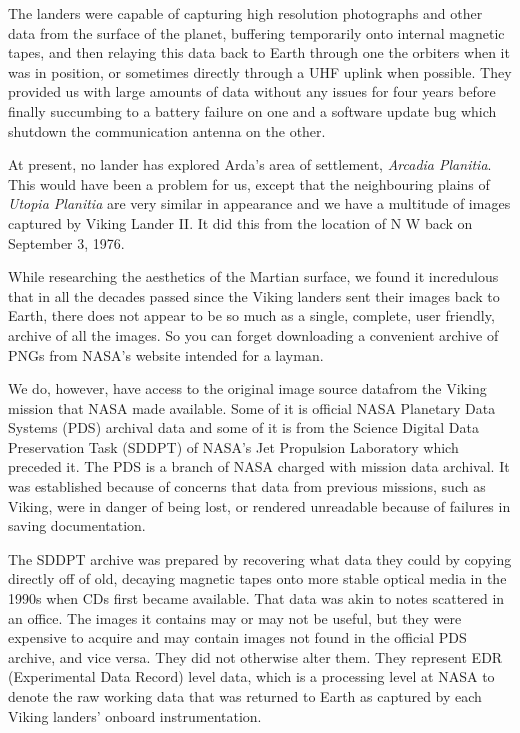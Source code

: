 The landers were capable of capturing high resolution photographs and other data from the surface of the planet, buffering temporarily onto internal magnetic tapes, and then relaying this data back to Earth through one the orbiters when it was in position, or sometimes directly through a UHF uplink when possible. They provided us with large amounts of data without any issues for four years before finally succumbing to a battery failure on one and a software update bug which shutdown the communication antenna on the other.

At present, no lander has explored Arda's area of settlement, {\it Arcadia Planitia}. This would have been a problem for us, except that the neighbouring plains of {\it Utopia Planitia} are very similar in appearance and we have a multitude of images captured by Viking Lander II. It did this from the location of N W back on September 3, 1976.

    {}


While researching the aesthetics of the Martian surface, we found it incredulous that in all the decades passed since the Viking landers sent their images back to Earth, there does not appear to be so much as a single, complete, user friendly, archive of all the images. So you can forget downloading a convenient archive of PNGs from NASA's website intended for a layman.\footnotecite[grayzeck2008]

We do, however, have access to the original image source data from the Viking mission that NASA made available. Some of it is official NASA Planetary Data Systems (PDS) archival data and some of it is from the Science Digital Data Preservation Task (SDDPT) of NASA's Jet Propulsion Laboratory which preceded it. The PDS is a branch of NASA charged with mission data archival. It was established because of concerns that data from previous missions, such as Viking, were in danger of being lost, or rendered unreadable because of failures in saving documentation.

The SDDPT archive was prepared by recovering what data they could by copying directly off of old, decaying magnetic tapes onto more stable optical media in the 1990s when CDs first became available. That data was  akin to notes scattered in an office. The images it contains may or may not be useful, but they were expensive to acquire and may contain images not found in the official PDS archive, and vice versa. They did not otherwise alter them. They represent EDR (Experimental Data Record) level data, which is a processing level at NASA to denote the raw working data that was returned to Earth as captured by each Viking landers' onboard instrumentation.

